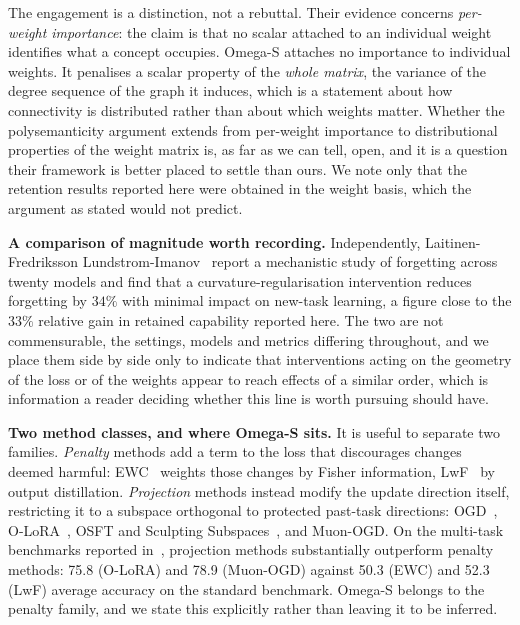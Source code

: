 \documentclass[11pt,a4paper]{article}
\begin{document}
The engagement is a distinction, not a rebuttal. Their evidence concerns
\emph{per-weight importance}: the claim is that no scalar attached to an
individual weight identifies what a concept occupies. Omega-S attaches no
importance to individual weights. It penalises a scalar property of the
\emph{whole matrix}, the variance of the degree sequence of the graph it
induces, which is a statement about how connectivity is distributed rather
than about which weights matter. Whether the polysemanticity argument extends
from per-weight importance to distributional properties of the weight matrix
is, as far as we can tell, open, and it is a question their framework is
better placed to settle than ours. We note only that the retention results
reported here were obtained in the weight basis, which the argument as stated
would not predict.

\textbf{A comparison of magnitude worth recording.} Independently,
Laitinen-Fredriksson Lundstrom-Imanov~\cite{lundstrom2026} report a
mechanistic study of forgetting across twenty models and find that a
curvature-regularisation intervention reduces forgetting by $34\%$ with
minimal impact on new-task learning, a figure close to the $33\%$ relative
gain in retained capability reported here. The two are not commensurable, the
settings, models and metrics differing throughout, and we place them side by
side only to indicate that interventions acting on the geometry of the loss
or of the weights appear to reach effects of a similar order, which is
information a reader deciding whether this line is worth pursuing should
have.

\textbf{Two method classes, and where Omega-S sits.} It is useful to
separate two families. \emph{Penalty} methods add a term to the loss that
discourages changes deemed harmful: EWC~\cite{kirkpatrick2017} weights those
changes by Fisher information, LwF~\cite{li2017lwf} by output distillation.
\emph{Projection} methods instead modify the update direction itself,
restricting it to a subspace orthogonal to protected past-task directions:
OGD~\cite{farajtabar2020}, O-LoRA~\cite{wang2023olora}, OSFT and Sculpting
Subspaces~\cite{nayak2025}, and Muon-OGD. On the multi-task benchmarks
reported in~\cite{lu2026muonogd}, projection methods substantially
outperform penalty methods: 75.8 (O-LoRA) and 78.9 (Muon-OGD) against 50.3
(EWC) and 52.3 (LwF) average accuracy on the standard benchmark. Omega-S belongs to the penalty family, and we state
this explicitly rather than leaving it to be inferred.
\end{document}
